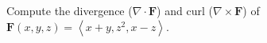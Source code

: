 Compute the divergence ($\nabla\cdot \mathbf{F}$) and curl ($\nabla\times\mathbf{F}$) of $\mathbf{F}(x,y,z) = \left<x+y,z^2,x-z\right>$.